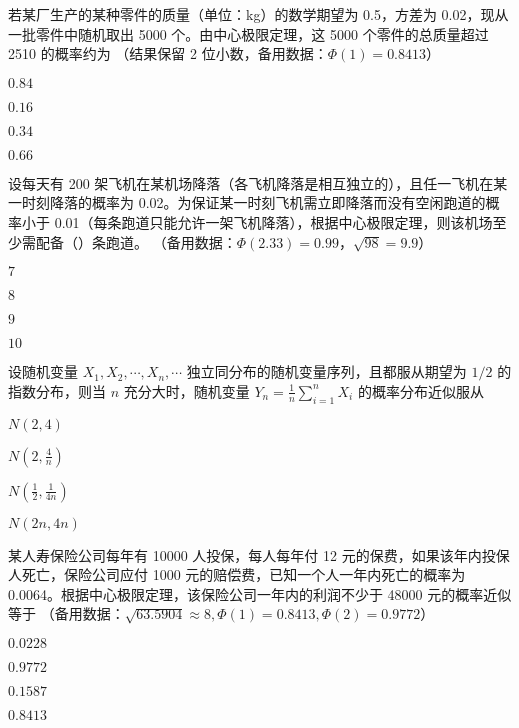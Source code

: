 \documentclass{exam-zh}
\begin{document}
\begin{question}
  若某厂生产的某种零件的质量（单位：kg）的数学期望为 0.5，方差为 0.02，现从一批零件中随机取出 5000 个。由中心极限定理，这 5000 个零件的总质量超过 2510 的概率约为 
  （结果保留 2 位小数，备用数据：$\Phi(1) = 0.8413$）
  \paren[B]

  \begin{choices}
    \item $0.84$
    \item $0.16$
    \item $0.34$
    \item $0.66$
  \end{choices}
\end{question}

\begin{question}
  设每天有 200 架飞机在某机场降落（各飞机降落是相互独立的），且任一飞机在某一时刻降落的概率为 0.02。为保证某一时刻飞机需立即降落而没有空闲跑道的概率小于 0.01（每条跑道只能允许一架飞机降落），根据中心极限定理，则该机场至少需配备（\quad ）条跑道。
  （备用数据：$\Phi(2.33) = 0.99$，$\sqrt{98} = 9.9$）
  \paren[C]

  \begin{choices}
    \item $7$
    \item $8$
    \item $9$
    \item $10$
  \end{choices}
\end{question}

\begin{question}
  设随机变量 $X_1, X_2, \cdots, X_n, \cdots$ 独立同分布的随机变量序列，且都服从期望为 $1/2$ 的指数分布，则当 $n$ 充分大时，随机变量
  $Y_n = \frac{1}{n} \sum_{i=1}^n X_i$
  的概率分布近似服从 \paren[C]

  \begin{choices}
    \item $N(2,4)$
    \item $N\left(2,\frac{4}{n}\right)$
    \item $N\left(\frac{1}{2},\frac{1}{4n}\right)$
    \item $N(2n,4n)$
  \end{choices}
\end{question}

\begin{question}
  某人寿保险公司每年有 10000 人投保，每人每年付 12 元的保费，如果该年内投保人死亡，保险公司应付 1000 元的赔偿费，已知一个人一年内死亡的概率为 0.0064。根据中心极限定理，该保险公司一年内的利润不少于 48000 元的概率近似等于 
  （备用数据：$\sqrt{63.5904} \approx 8, \Phi(1) = 0.8413, \Phi(2) = 0.9772$）
  \paren[D]

  \begin{choices}
    \item $0.0228$
    \item $0.9772$
    \item $0.1587$
    \item $0.8413$
  \end{choices}
\end{question}
\end{document}
